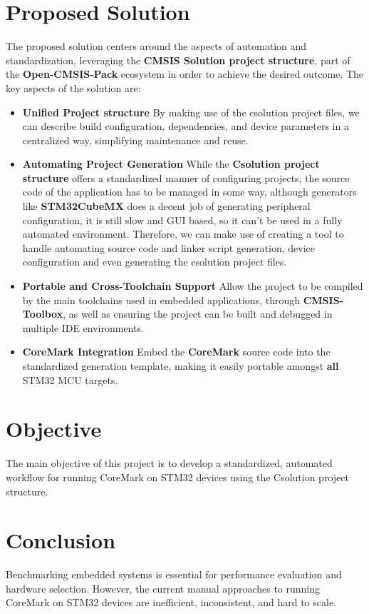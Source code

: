 \section{Proposed Solution}
The proposed solution centers around the aspects of automation and standardization, leveraging the \textbf{CMSIS Solution project structure}, part of the \textbf{Open-CMSIS-Pack} ecosystem in order to achieve the desired outcome.
The key aspects of the solution are:
\begin{itemize}
  \item \textbf{Unified Project structure}
  By making use of the csolution project files, we can describe build configuration, dependencies, and device parameters in a centralized way, simplifying maintenance and reuse.
  \item \textbf{Automating Project Generation}
  While the \textbf{Csolution project structure} offers a standardized manner of configuring projects, the source code of the application has to be managed in some way, although generators like \textbf{STM32CubeMX} does a decent job of generating peripheral configuration, it is still slow and GUI based, so it can't be used in a fully automated environment.
  Therefore, we can make use of creating a tool to handle automating source code and linker script generation, device configuration and even generating the csolution project files.
  \item \textbf{Portable and Cross-Toolchain Support}
  Allow the project to be compiled by the main toolchains used in embedded applications, through \textbf{CMSIS-Toolbox}, as well as ensuring the project can be built and debugged in multiple IDE environments.
  \item \textbf{CoreMark Integration}
  Embed the \textbf{CoreMark} source code into the standardized generation template, making it easily portable amongst \textbf{all} STM32 MCU targets. 
\end{itemize}

\section{Objective}
The main objective of this project is to develop a standardized, automated workflow for running CoreMark on STM32 devices using the Csolution project structure.

\section{Conclusion}
Benchmarking embedded systems is essential for performance evaluation and hardware selection. However, the current manual approaches to running CoreMark on STM32 devices are inefficient, inconsistent, and hard to scale.

